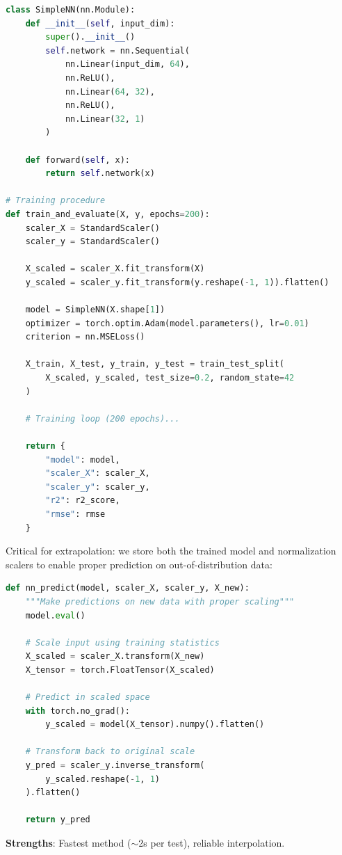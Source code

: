 \documentclass[twoside,11pt]{article}
\begin{document}
\begin{lstlisting}[language=Python, caption=Neural Network Architecture]
class SimpleNN(nn.Module):
    def __init__(self, input_dim):
        super().__init__()
        self.network = nn.Sequential(
            nn.Linear(input_dim, 64),
            nn.ReLU(),
            nn.Linear(64, 32),
            nn.ReLU(),
            nn.Linear(32, 1)
        )

    def forward(self, x):
        return self.network(x)

# Training procedure
def train_and_evaluate(X, y, epochs=200):
    scaler_X = StandardScaler()
    scaler_y = StandardScaler()

    X_scaled = scaler_X.fit_transform(X)
    y_scaled = scaler_y.fit_transform(y.reshape(-1, 1)).flatten()

    model = SimpleNN(X.shape[1])
    optimizer = torch.optim.Adam(model.parameters(), lr=0.01)
    criterion = nn.MSELoss()

    X_train, X_test, y_train, y_test = train_test_split(
        X_scaled, y_scaled, test_size=0.2, random_state=42
    )

    # Training loop (200 epochs)...

    return {
        "model": model,
        "scaler_X": scaler_X,
        "scaler_y": scaler_y,
        "r2": r2_score,
        "rmse": rmse
    }
\end{lstlisting}

Critical for extrapolation: we store both the trained model and normalization scalers to enable proper prediction on out-of-distribution data:

\begin{lstlisting}[language=Python, caption=Neural Network Prediction with Proper Scaling]
def nn_predict(model, scaler_X, scaler_y, X_new):
    """Make predictions on new data with proper scaling"""
    model.eval()

    # Scale input using training statistics
    X_scaled = scaler_X.transform(X_new)
    X_tensor = torch.FloatTensor(X_scaled)

    # Predict in scaled space
    with torch.no_grad():
        y_scaled = model(X_tensor).numpy().flatten()

    # Transform back to original scale
    y_pred = scaler_y.inverse_transform(
        y_scaled.reshape(-1, 1)
    ).flatten()

    return y_pred
\end{lstlisting}

\textbf{Strengths}: Fastest method ($\sim$2s per test), reliable interpolation.
\end{document}
